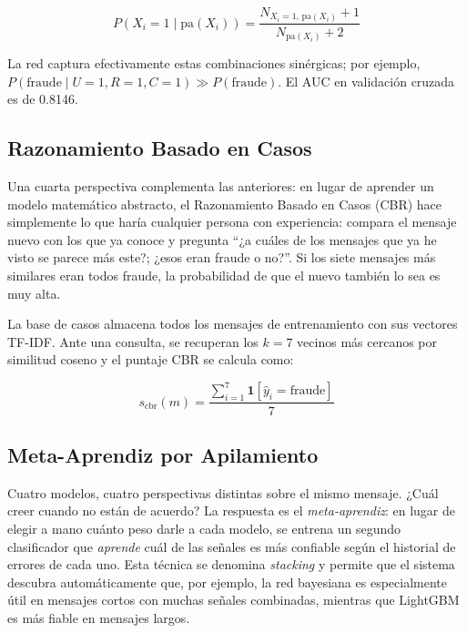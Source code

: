\documentclass{llncs}
\begin{document}
\begin{equation}
  P(X_i = 1 \mid \mathrm{pa}(X_i)) =
    \frac{N_{X_i=1,\,\mathrm{pa}(X_i)} + 1}
         {N_{\mathrm{pa}(X_i)} + 2}
\end{equation}

La red captura efectivamente estas combinaciones sinérgicas;
por ejemplo, $P(\mathrm{fraude} \mid U=1, R=1, C=1) \gg P(\mathrm{fraude})$.
El AUC en validación cruzada es de 0.8146.

\subsection{Razonamiento Basado en Casos}
\label{sec:ml:cbr}

Una cuarta perspectiva complementa las anteriores: en lugar de
aprender un modelo matemático abstracto, el Razonamiento Basado en
Casos (CBR) hace simplemente lo que haría cualquier persona con
experiencia: compara el mensaje nuevo con los que ya conoce y
pregunta ``¿a cuáles de los mensajes que ya he visto se parece más
este?; ¿esos eran fraude o no?''.
Si los siete mensajes más similares eran todos fraude, la probabilidad
de que el nuevo también lo sea es muy alta.

La base de casos almacena todos los mensajes de entrenamiento
con sus vectores TF-IDF.
Ante una consulta, se recuperan los $k=7$ vecinos más cercanos
por similitud coseno y el puntaje CBR se calcula como:

\begin{equation}
  s_{\mathrm{cbr}}(m) = \frac{\sum_{i=1}^{7} \mathbf{1}[\hat{y}_i = \mathrm{fraude}]}{7}
  \label{eq:cbr}
\end{equation}

\subsection{Meta-Aprendiz por Apilamiento}
\label{sec:ml:meta}

Cuatro modelos, cuatro perspectivas distintas sobre el mismo mensaje.
¿Cuál creer cuando no están de acuerdo?
La respuesta es el \emph{meta-aprendiz}: en lugar de elegir a mano
cuánto peso darle a cada modelo, se entrena un segundo clasificador
que \emph{aprende} cuál de las señales es más confiable según el
historial de errores de cada uno.
Esta técnica se denomina \emph{stacking} y permite que el sistema
descubra automáticamente que, por ejemplo, la red bayesiana es
especialmente útil en mensajes cortos con muchas señales combinadas,
mientras que LightGBM es más fiable en mensajes largos.
\end{document}
